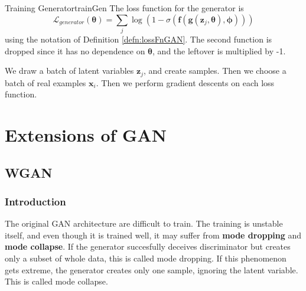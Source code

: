 \documentclass{article}
\begin{document}
            \begin{defn}{Training Generator}{trainGen}
                The loss function for the generator is
                \[
                \mathcal L_{generator} (\bm{\theta}) =
                \sum_{j} \log{(1 - \sigma(\textbf{f}(\textbf{g}(\mathbf{z}_j, \bm{\theta}), \bm{\phi})))}
                \]
                using the notation of Definition \ref{defn:lossFnGAN}. The second function is dropped since it has
                no dependence on $\bm{\theta}$, and the leftover is multiplied by -1.
            \end{defn}

            We draw a batch of latent variables $\textbf{z}_j$, and create samples. Then we choose a batch of real examples
            $\textbf{x}_i$. Then we perform gradient descents on each loss function.


\section{Extensions of GAN}\label{sec:exGAN}
    \subsection{WGAN}
        \subsubsection{Introduction}
            The original GAN architecture are difficult to train. The training is unstable itself,
            and even though it is trained well, it may suffer from \textbf{mode dropping} and \textbf{mode collapse}.
            If the generator succesfully deceives discriminator but creates only a subset of whole data, this is called mode dropping.
            If this phenomenon gets extreme, the generator creates only one sample, ignoring the latent variable.
            This is called mode collapse.
\end{document}
